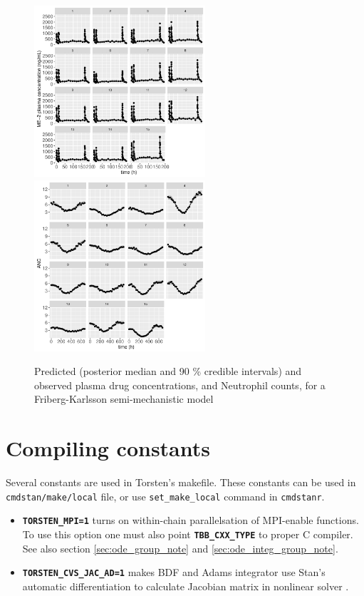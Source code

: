 \documentclass[10pt, reqno, oneside]{amsbook}
\numberwithin{equation}{chapter}
\numberwithin{figure}{chapter}
\numberwithin{table}{chapter}
\theoremstyle{remark}
\begin{document}
\begin{figure}[htbp]
\includegraphics[width=2.5in,trim=0in 0in 0 0in]{graphics/neutropenia_0.82/neutropeniaPopulationPlots010.pdf}
\includegraphics[width=2.5in,trim=0in 0in 0 0in]{graphics/neutropenia_0.82/neutropeniaPopulationPlots011.pdf}
\caption{{Predicted (posterior median and 90 \% credible intervals) and observed plasma drug concentrations, and Neutrophil counts, for a Friberg-Karlsson semi-mechanistic model}}
\label{FKPredictions}
\end{figure}

\appendix
\chapter*{Compiling constants}
\label{sec:orga5d879d}
Several constants are used in Torsten's makefile. These constants can
be used in \texttt{cmdstan/make/local} file, or use \texttt{set\_make\_local} command
in \texttt{cmdstanr}.
\begin{itemize}
\item {\small \color{MRGGreen} \texttt{\textbf{TORSTEN\_MPI=1}}} turns on within-chain parallelsation of MPI-enable
functions. To use this option one must also point
{\small \color{MRGGreen} \texttt{\textbf{TBB\_CXX\_TYPE}}} to proper C compiler. See also section \ref{sec:ode_group_note} and \ref{sec:ode_integ_group_note}.
\item {\small \color{MRGGreen} \texttt{\textbf{TORSTEN\_CVS\_JAC\_AD=1}}} makes BDF and Adams
integrator use Stan's automatic differentiation to calculate
Jacobian matrix in nonlinear solver \cite{hindmarsh_cvodes_2020}.
\end{itemize}

\printindex

\backmatter



\end{document}
